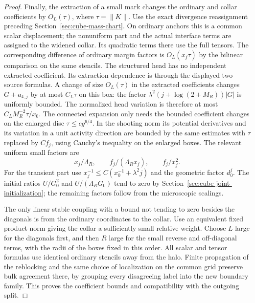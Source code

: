 \documentclass[11pt]{article}
\theoremstyle{definition}
\begin{document}
\begin{proof}
Finally, the extraction of a small mark changes the ordinary and
collar coefficients by \(O_L(\tau)\), where \(\tau=\|K\|\).
Use the exact divergence reassignment preceding
Section~\ref{sec:cube-mass-chart}. On ordinary anchors this is a
common scalar displacement; the nonuniform part and the actual
interface terms are assigned to the widened collar. Its quadratic
terms there use the full tensors. The corresponding difference of
ordinary margin factors is \(O_L(x_j\tau)\) by the bilinear
comparison on the same stencils. The structured head has no
independent extracted coefficient. Its extraction dependence is
through the displayed two source formulas. A change of size
\(O_L(\tau)\) in the extracted coefficients changes \(G+a_{4,j}\)
by at most \(C_L\tau\) on this box: the factor
\(\lambda^2(j+\log(2+M_R))|G|\) is uniformly bounded.
The normalized head variation is therefore at most
\(C_L M_R^{-2}\tau/x_0\). The connected expansion only needs the
bounded coefficient changes on the enlarged disc
\(\tau\le c g^{9/4}\). In the shooting norm its potential
derivatives and its variation in a unit activity direction
are bounded by the same estimates with \(\tau\) replaced by
\(C f_j\), using Cauchy's inequality on the enlarged boxes.
The relevant uniform small factors are
\begin{equation}
 x_j/\Lambda_R,\qquad f_j/(\Lambda_R x_j),\qquad f_j/x_j^2 .
\end{equation}
For the transient part use
\(x_j^{-1}\le C(x_0^{-1}+\lambda^2j)\) and the geometric factor
\(d_0^j\). The initial ratios \(U/G_0^2\) and
\(U/(\Lambda_R G_0)\) tend to zero by
Section~\ref{sec:cube-joint-initialization}; the remaining factors
follow from the microscopic scalings.

The only linear stable coupling with a bound not tending to zero
besides the diagonals is from the ordinary coordinates to the
collar. Use an equivalent fixed product norm giving the collar
a sufficiently small relative weight. Choose \(L\) large for the
diagonals first, and then \(R\) large for the small reverse and
off-diagonal terms, with the radii of the boxes fixed in this order.
All scalar and tensor formulas use identical ordinary stencils
away from the halo. Finite propagation of the reblocking and the
same choice of localization on the common grid preserve bulk
agreement there, by grouping every disagreeing label into the
new boundary family. This proves the coefficient bounds and
compatibility with the outgoing split.
\end{proof}
\end{document}
